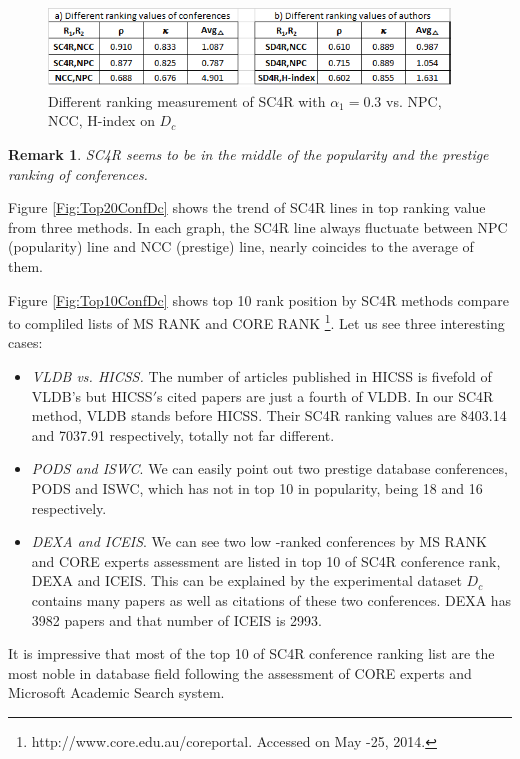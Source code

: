 \documentclass[10pt,leqno,twoside]{article}
\newtheorem{remark}{\indent Remark}[section]
\begin{document}
\begin{figure}
	\caption{Different ranking measurement of SC4R with $\alpha_1=0.3$ vs. NPC, NCC, H-index on $D_c$}
	\label{Fig:DiffRank}
    \centering
    \includegraphics[width=0.95\textwidth]{DiffRank}
\end{figure}
%
%
\begin{remark}
SC4R seems to be in the middle of the popularity and the prestige ranking of conferences.
\end{remark}
Figure \ref{Fig:Top20ConfDc} shows the trend of SC4R lines in top ranking value from three methods. In each graph, the SC4R line always fluctuate between NPC (popularity) line and NCC (prestige) line, nearly coincides to the average of them.


Figure \ref{Fig:Top10ConfDc} shows top 10 rank position by SC4R methods compare to compliled lists of MS RANK \cite{microsoft} and CORE RANK \footnote{http://www.core.edu.au/coreportal. Accessed on May -25, 2014.}.
Let us see three interesting cases:
\begin{itemize}
\item \textit{VLDB vs. HICSS.} The number of articles published in HICSS is fivefold of VLDB's but HICSS$'$s cited papers are just a fourth of VLDB. In our SC4R method, VLDB stands before HICSS. Their SC4R ranking values are 8403.14 and 7037.91 respectively, totally not far different.

\item \textit{PODS and ISWC}. We can easily point out two prestige database conferences, PODS and ISWC, which has not in top 10 in popularity, being 18 and 16 respectively.

\item \textit{DEXA and ICEIS}. We can see two low -ranked conferences by MS RANK and CORE experts assessment are listed in top 10 of SC4R conference rank, DEXA and ICEIS. This can be explained by the experimental dataset $D_c$ contains many papers as well as citations of these two conferences. DEXA has 3982 papers and that number of ICEIS is 2993.
\end{itemize}

It is impressive that most of the top 10 of SC4R conference ranking list are the most noble in database field following the assessment of CORE experts and Microsoft Academic Search system.
\end{document}
